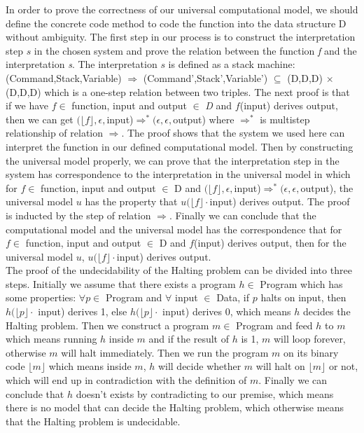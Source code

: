\documentclass{jfrarticle}
\begin{document}
In order to prove the correctness of our universal computational model, we should define the concrete code method to code the function into the data structure D without ambiguity.
The first step in our process is to construct the interpretation step $s$ in the chosen system and prove the relation between the function \textit{f} and the interpretation \textit{s}.
The interpretation $s$ is defined as a stack machine: (Command,Stack,Variable) $\Rightarrow$ (Command',Stack',Variable') $\subseteq$ (D,D,D) $\times$ (D,D,D) which is a one-step relation between two triples.
The next proof is that if we have $f \in$ function, input and output $\in$ \textit{D} and $f$(input) derives output, then we can get $(\lfloor f\rfloor,\epsilon,$input)$ \Rightarrow^{*} (\epsilon,\epsilon,$output) where $\Rightarrow^{*}$ is multistep relationship of relation $\Rightarrow$.
The proof shows that the system we used here can interpret the function in our defined computational model.
Then by constructing the universal model properly, we can prove that the interpretation step in the system has correspondence to the interpretation in the universal model in which for $f \in$ function, input and output $\in$ D and $(\lfloor f\rfloor,\epsilon,$input)$ \Rightarrow^{*} (\epsilon,\epsilon,$output), the universal model $u$ has the property that $u(\lfloor f\rfloor \cdot $input) derives output.
The proof is inducted by the step of relation $\Rightarrow$.
Finally we can conclude that the computational model and the universal model has the correspondence that for $f \in$ function, input and output $\in$ D and $f$(input) derives output, then for the universal model $u$,  $u(\lfloor f\rfloor \cdot $input) derives output.\\
The proof of the undecidability of the Halting problem can be divided into three steps.
Initially we assume that there exists a program $h \in$ Program which has some properties: $\forall p \in$ Program and $\forall$ input $\in$ Data, if $p$ halts on input, then $h(\lfloor p\rfloor \cdot$ input) derives 1, else $h(\lfloor p\rfloor \cdot$ input) derives 0, which means $h$ decides the Halting problem.
Then we construct a program $m \in$ Program and feed $h$ to $m$ which means running $h$ inside $m$ and if the result of $h$ is 1, $m$ will loop forever, otherwise $m$ will halt immediately.
Then we run the program $m$ on its binary code $\lfloor m\rfloor$ which means inside $m$, $h$ will decide whether $m$ will halt on $\lfloor m\rfloor$ or not, which will end up in contradiction with the definition of $m$.
Finally we can conclude that $h$ doesn't exists by contradicting to our premise, which means there is no model that can decide the Halting problem, which otherwise means that the Halting problem is undecidable.
\end{document}
